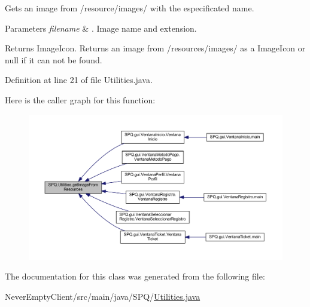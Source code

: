 Gets an image from /resource/images/ with the especificated name. 
\begin{DoxyParams}{Parameters}
{\em filename} & . Image name and extension. \\
\hline
\end{DoxyParams}
\begin{DoxyReturn}{Returns}
Image\+Icon. Returns an image from /resources/images/ as a Image\+Icon or null if it can not be found. 
\end{DoxyReturn}


Definition at line 21 of file Utilities.\+java.

Here is the caller graph for this function\+:
\nopagebreak
\begin{figure}[H]
\begin{center}
\leavevmode
\includegraphics[width=350pt]{class_s_p_q_1_1_utilities_a1ca9779d00f9480c9c0ccb654c558fbb_icgraph}
\end{center}
\end{figure}


The documentation for this class was generated from the following file\+:\begin{DoxyCompactItemize}
\item 
Never\+Empty\+Client/src/main/java/\+S\+P\+Q/\mbox{\hyperlink{_utilities_8java}{Utilities.\+java}}\end{DoxyCompactItemize}

